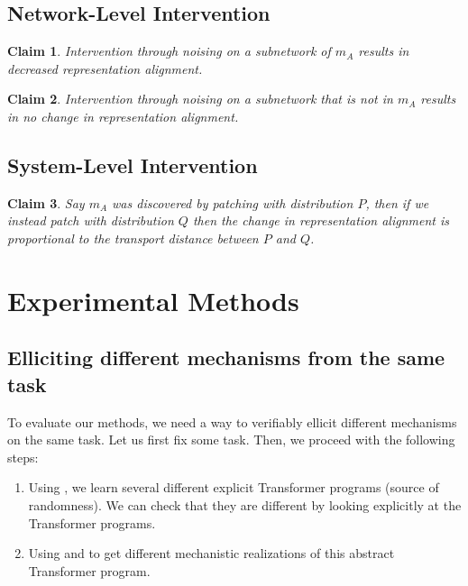 \documentclass{article}
\newtheorem{claim}{Claim}
\begin{document}
\subsection{Network-Level Intervention}
\begin{claim}
Intervention through noising on a subnetwork of $m_A$ results in decreased representation
alignment.
\end{claim}
\begin{claim}
Intervention through noising on a subnetwork that is not in $m_A$ results in no change in
representation alignment.
\end{claim}

\subsection{System-Level Intervention}
\begin{claim}
Say $m_A$ was discovered by patching with distribution $P$, then if we instead patch
with distribution $Q$ then the change in representation alignment is proportional to
the transport distance between $P$ and $Q$.
\end{claim}



\section{Experimental Methods}


\subsection{Elliciting different mechanisms from the same task}
To evaluate our methods, we need a way to verifiably ellicit different mechanisms
on the same task. Let us first fix some task. Then, we proceed with the following
steps:
\begin{enumerate}[nosep, leftmargin=*]
\item Using \cite{friedman_learning_2023}, we learn several different explicit
Transformer programs (source of randomness). We can check that they are different
by looking explicitly at the Transformer programs. 
\item Using \cite{gupta_interpbench_2024} and \cite{geiger24alignments} to get
different mechanistic realizations of this abstract Transformer program. 
\end{enumerate}




\end{document}
